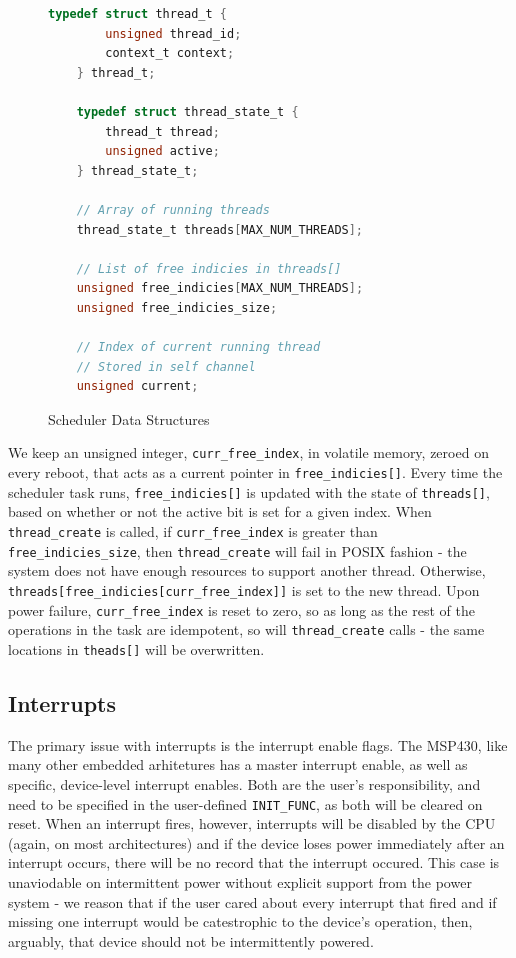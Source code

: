 \documentclass[11pt]{sensys-proc}
\begin{document}
\begin{figure}[ht]
\begin{minipage}[b]{.9\columnwidth}
\begin{lstlisting}[language=C]
    typedef struct thread_t {
        unsigned thread_id;
        context_t context;
    } thread_t;

    typedef struct thread_state_t {
        thread_t thread;
        unsigned active;
    } thread_state_t;

    // Array of running threads
    thread_state_t threads[MAX_NUM_THREADS];

    // List of free indicies in threads[]
    unsigned free_indicies[MAX_NUM_THREADS];
    unsigned free_indicies_size;

    // Index of current running thread
    // Stored in self channel
    unsigned current;
\end{lstlisting}
\caption{Scheduler Data Structures}\label{schDataStruct}
\end{minipage}
\end{figure}

We keep an unsigned integer, \texttt{curr\_free\_index}, in volatile memory,
zeroed on every reboot, that acts as a current pointer in
\texttt{free\_indicies[]}. Every time the scheduler task runs,
\texttt{free\_indicies[]} is updated with the state of \texttt{threads[]},
based on whether or not the active bit is set for a given index. When
\texttt{thread\_create} is called, if \texttt{curr\_free\_index} is greater
than \texttt{free\_indicies\_size}, then \texttt{thread\_create} will fail in
POSIX fashion - the system does not have enough resources to support another
thread. Otherwise, \texttt{threads[free\_indicies[curr\_free\_index]]} is set
to the new thread. Upon power failure, \texttt{curr\_free\_index} is reset to
zero, so as long as the rest of the operations in the task are idempotent, so
will \texttt{thread\_create} calls - the same locations in \texttt{theads[]}
will be overwritten.



\subsection{Interrupts}
The primary issue with interrupts is the interrupt enable flags. The MSP430,
like many other embedded arhitetures has a master interrupt enable,
as well as specific, device-level interrupt enables. Both are the user's
responsibility, and need to be specified in the user-defined
\texttt{INIT\_FUNC}, as both will be cleared on reset. When an interrupt fires,
however, interrupts will be disabled by the CPU (again, on most architectures)
and if the device loses power immediately after an interrupt occurs, there will
be no record that the interrupt occured. This case is unaviodable on
intermittent power without explicit support from the power system - we reason
that if the user cared about every interrupt that fired and if missing one
interrupt would be catestrophic to the device's operation, then, arguably, that
device should not be intermittently powered.
\end{document}
